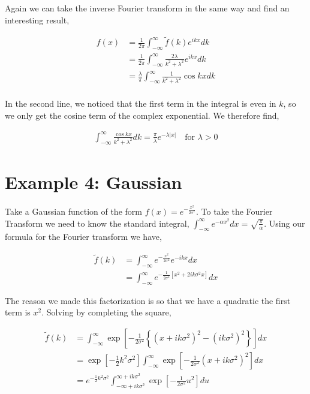 \documentclass[11pt]{amsart}
\begin{document}
Again we can take the inverse Fourier transform in the same way and find an interesting result,

\begin{align*}
  f(x) &= \frac{1}{2\pi}\int_{-\infty}^{\infty}\tilde{f}(k)e^{ikx}dk \\
       &= \frac{1}{2\pi}\int_{-\infty}^{\infty}\frac{2\lambda}{k^2+\lambda^2}e^{ikx}dk \\
       &= \frac{\lambda}{\pi}\int_{-\infty}^{\infty}\frac{1}{k^2+\lambda^2}\cos{kx}dk \\
\end{align*}

In the second line, we noticed that the first term in the integral is even in $k$, so we only get the cosine term of the complex exponential. We therefore find,

\begin{align*}
  \int_{-\infty}^{\infty} \frac{\cos{kx}}{k^2+\lambda^2} dk = \frac{\pi}{\lambda}e^{-\lambda |x|} \quad \text{for $\lambda > 0$}
\end{align*}

\section{Example 4: Gaussian}

Take a Gaussian function of the form $f(x) = e^{-\frac{x^2}{2\sigma^2}}$. To take the Fourier Transform we need to know the standard integral, $\int_{-\infty}^{\infty} e^{-\alpha x^2} dx = \sqrt{\frac{\pi}{\alpha}}$. Using our formula for the Fourier transform we have,

\begin{align*}
  \tilde{f}(k) &= \int_{-\infty}^{\infty} e^{-\frac{x^2}{2\sigma^2}} e^{-ikx} dx \\
               &= \int_{-\infty}^{\infty} e^{-\frac{1}{2\sigma^2}\left[x^2 + 2ik\sigma^2 x\right]} dx
\end{align*}

The reason we made this factorization is so that we have a quadratic the first term is $x^2$. Solving by completing the square,

\begin{align*}
  \tilde{f}(k) &= \int_{-\infty}^{\infty} \exp{\left[-\frac{1}{2\sigma^2} \left\{ {\left(x+ik\sigma^2\right)}^2 - {\left(ik\sigma^2\right)}^2\right\}\right]} dx \\
               &= \exp{\left[-\frac{1}{2}k^2\sigma^2\right]}\int_{-\infty}^{\infty}\exp{\left[-\frac{1}{2\sigma^2}{\left(x + ik\sigma^2\right)}^2\right]} dx \\
               &= e^{-\frac{1}{2}k^2\sigma^2}\int_{-\infty + ik\sigma^2}^{\infty + ik\sigma^2} \exp{\left[-\frac{1}{2\sigma^2}u^2\right]} du
\end{align*}
\end{document}
